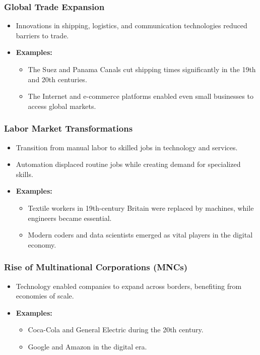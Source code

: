 \documentclass{article}
\begin{document}
\subsubsection*{Global Trade Expansion}
\begin{itemize}
    \item Innovations in shipping, logistics, and communication technologies reduced barriers to trade.
    \item \textbf{Examples:}
    \begin{itemize}
        \item The Suez and Panama Canals cut shipping times significantly in the 19th and 20th centuries.
        \item The Internet and e-commerce platforms enabled even small businesses to access global markets.
    \end{itemize}
\end{itemize}

\subsubsection*{ Labor Market Transformations}
\begin{itemize}
    \item Transition from manual labor to skilled jobs in technology and services.
    \item Automation displaced routine jobs while creating demand for specialized skills.
    \item \textbf{Examples:}
    \begin{itemize}
        \item Textile workers in 19th-century Britain were replaced by machines, while engineers became essential.
        \item Modern coders and data scientists emerged as vital players in the digital economy.
    \end{itemize}
\end{itemize}

\subsubsection*{ Rise of Multinational Corporations (MNCs)}
\begin{itemize}
    \item Technology enabled companies to expand across borders, benefiting from economies of scale.
    \item \textbf{Examples:}
    \begin{itemize}
        \item Coca-Cola and General Electric during the 20th century.
        \item Google and Amazon in the digital era.
    \end{itemize}
\end{itemize}
\end{document}
